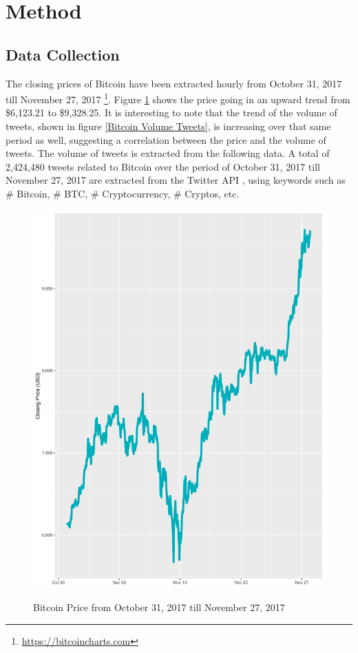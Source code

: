 \documentclass[conference]{IEEEtran}
\begin{document}
\section{Method}

\subsection{Data Collection}
\par The closing prices of Bitcoin have been extracted hourly from October 31, 2017 till November 27, 2017 \footnote{\url{https://bitcoincharts.com}}. Figure \ref{Bitcoin Price} shows the price going in an upward trend from \$6,123.21 to \$9,328.25. It is interesting to note that the trend of the volume of tweets, shown in figure \ref{Bitcoin Volume Tweets}, is increasing over that same period as well, suggesting a correlation between the price and the volume of tweets. The volume of tweets is extracted from the following data. A total of 2,424,480 tweets related to Bitcoin over the period  of October 31, 2017 till November 27, 2017 are extracted from the Twitter API \cite{Twitter API}, using keywords such as \# Bitcoin, \# BTC, \# Cryptocurrency, \# Cryptos, etc. 

\begin{minipage}{\linewidth}
\begin{figure}[H]
\centering
\caption{Bitcoin Price from October 31, 2017 till November 27, 2017} 
\includegraphics[scale=0.3]{Graphs/BitcoinPriceChart.pdf}
\label{Bitcoin Price} 
\end{figure}
\end{minipage}
\end{document}

